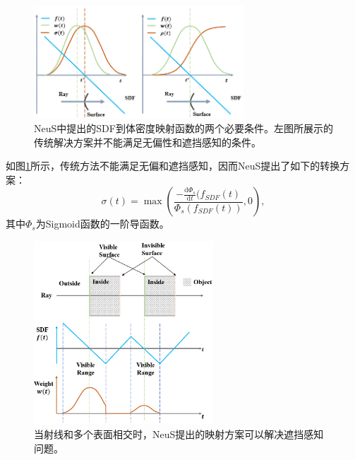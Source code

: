 \begin{figure}[ht]
    \centering
    \includegraphics[width=0.7\textwidth]{undergraduate-thesis/images/related-work/neus conditions.png}
    \caption{NeuS\cite{wang_neus_2021}中提出的SDF到体密度映射函数的两个必要条件。左图所展示的传统解决方案并不能满足无偏性和遮挡感知的条件。}
    \label{fig: related-work neus conditions}
\end{figure}

如图\ref{fig: related-work neus conditions}所示，传统方法不能满足无偏和遮挡感知，因而NeuS提出了如下的转换方案：
\begin{equation}
    \sigma(t) = \max\left(\frac{-\frac{\text{d}\Phi_s}{\text{d}t}(f_{SDF}(t)}{\Phi_s(f_{SDF}(t))}, 0\right),
    \label{eq: related-work neus function}
\end{equation}
其中$\Phi_s$为Sigmoid函数的一阶导函数。

\begin{figure}[ht]
    \centering
    \includegraphics[width=0.6\textwidth]{undergraduate-thesis/images/related-work/neus multiple-surfaces.png}
    \caption{当射线和多个表面相交时，NeuS\cite{wang_neus_2021}提出的映射方案可以解决遮挡感知问题。}
    \label{fig:related-work occlusion-aware}
\end{figure}

